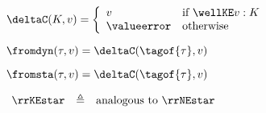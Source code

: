 \begin{flushleft}
\medskip
$\deltaC(K, v) = \left\{\begin{array}{l l}
  v & \mbox{if $\wellKE v : K$}
\\
  \valueerror & \mbox{otherwise}
\end{array}\right.$

\medskip
$\fromdyn(\tau, v) = \deltaC(\tagof{\tau}, v)$

\medskip
$\fromsta(\tau, v) = \deltaC(\tagof{\tau}, v)$

\medskip
$\begin{array}{l c l}
  \rrKEstar & \triangleq & \mbox{analogous to $\rrNEstar$}
\end{array}$

\end{flushleft}
